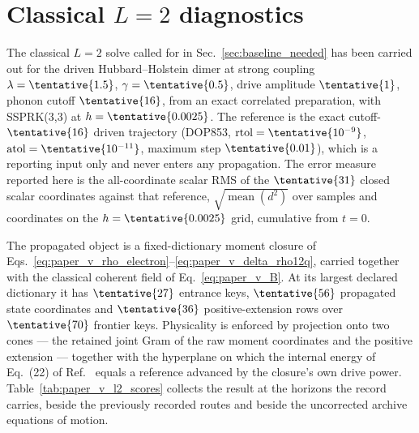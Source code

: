 %



\section{Classical \(L=2\) diagnostics}
\label{sec:paper_v_l2_results}

The classical \(L=2\) solve called for in Sec.~\ref{sec:baseline_needed} has
been carried out for the driven Hubbard--Holstein dimer at strong coupling
\(\lambda=\tentative{1.5}\), \(\gamma=\tentative{0.5}\), drive amplitude
\(\tentative{1}\), phonon cutoff \(\tentative{16}\), from an exact correlated
preparation, with SSPRK(3,3) at \(h=\tentative{0.0025}\).  The reference is
the exact cutoff-\(\tentative{16}\) driven trajectory (DOP853,
\(\mathrm{rtol}=\tentative{10^{-9}}\), \(\mathrm{atol}=\tentative{10^{-11}}\),
maximum step \(\tentative{0.01}\)), which is a reporting input only and never
enters any propagation.  The error measure reported here is the
all-coordinate scalar RMS of the \(\tentative{31}\) closed scalar coordinates
against that reference, \(\sqrt{\operatorname{mean}(d^{2})}\) over samples and
coordinates on the \(h=\tentative{0.0025}\) grid, cumulative from \(t=0\).

The propagated object is a fixed-dictionary moment closure of
Eqs.~\eqref{eq:paper_v_rho_electron}--\eqref{eq:paper_v_delta_rho12q}, carried
together with the classical coherent field of Eq.~\eqref{eq:paper_v_B}.  At
its largest declared dictionary it has \(\tentative{27}\) entrance keys,
\(\tentative{56}\) propagated state coordinates and \(\tentative{36}\)
positive-extension rows over \(\tentative{70}\) frontier keys.  Physicality is
enforced by projection onto two cones --- the retained joint Gram of the raw
moment coordinates and the positive extension --- together with the hyperplane
on which the internal energy of Eq.~(22) of Ref.~\cite{RivaSimoniPing2026}
equals a reference advanced by the closure's own drive power.
Table~\ref{tab:paper_v_l2_scores} collects the result at the horizons the
record carries, beside the previously recorded routes and beside the
uncorrected archive equations of motion.

